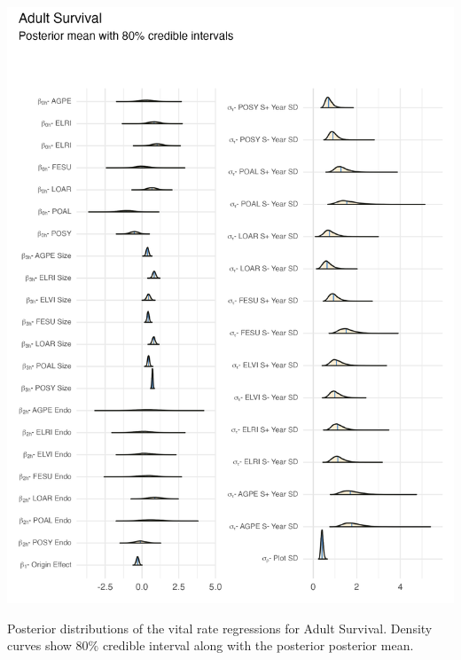 \documentclass[lineno, sn-basic]{sn-jnl}%
\begin{document}
\begin{myfigure}[H]
	\centering
	\includegraphics[width = \linewidth]{surv_posteriors_plot.png}
	\caption[Posterior distributions of the vital rate regressions for Adult Survival]{Posterior distributions of the vital rate regressions for Adult Survival. Density curves show $80\%$ credible interval along with the posterior posterior mean.}
\end{myfigure}
\end{document}
